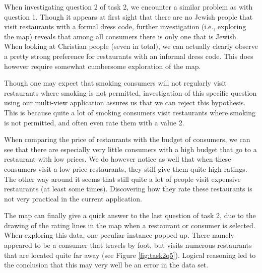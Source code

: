 When investigating question 2 of task 2, we encounter a similar problem as with question 1. Though it appears at first sight that there are no Jewish people that visit restaurants with a formal dress code, further investigation (i.e., exploring the map) reveals that among all consumers there is only one that is Jewish. When looking at Christian people (seven in total), we can actually clearly observe a pretty strong preference for restaurants with an informal dress code. This does however require somewhat cumbersome exploration of the map.

Though one may expect that smoking consumers will not regularly visit restaurants where smoking is not permitted, investigation of this specific question using our multi-view application assures us that we can reject this hypothesis. This is because quite a lot of smoking consumers visit restaurants where smoking is not permitted, and often even rate them with a value 2.

When comparing the price of restaurants with the budget of consumers, we can see that there are especially very little consumers with a high budget that go to a restaurant with low prices. We do however notice as well that when these consumers visit a low price restaurants, they still give them quite high ratings. The other way around it seems that still quite a lot of people visit expensive restaurants (at least some times). Discovering how they rate these restaurants is not very practical in the current application.

The map can finally give a quick answer to the last question of task 2, due to the drawing of the rating lines in the map when a restaurant or consumer is selected. When exploring this data, one peculiar instance popped up. There namely appeared to be a consumer that travels by foot, but visits numerous restaurants that are located quite far away (see Figure \ref{fig:task2q5}). Logical reasoning led to the conclusion that this may very well be an error in the data set.

